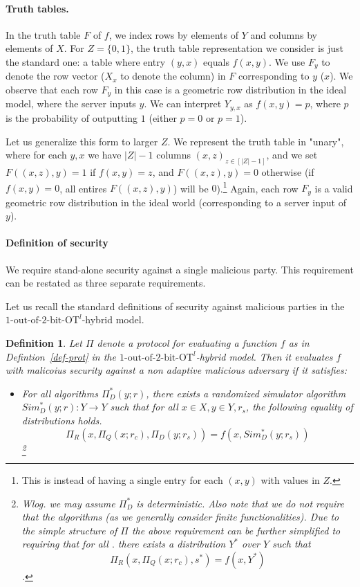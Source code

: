 \documentclass[a4paper]{article}
\newtheorem{definition}{Definition}[section]
\newcommand{\OT}[2]{#1\text{-out-of-}#2\text{-bit-OT}}
\begin{document}
\paragraph{Truth tables.} In the truth table $F$ of $f$, we index rows by elements of $Y$ and columns by elements of $X$. For $Z=\{0,1\}$, the truth table representation we consider is just the standard one: a table where entry $(y,x)$ equals $f(x,y)$. We use $F_y$ to denote the row vector ($X_x$ to denote the column) in $F$ corresponding to $y$ ($x$).
We observe that each row $F_y$ in this case is a geometric row distribution in the ideal model, where the server inputs $y$. We can interpret $Y_{y,x}$ as $f(x,y) = p$, where $p$ is the probability of outputting $1$ (either $p=0$ or $p=1$). 


Let us generalize this form to larger $Z$. We represent the truth table in "unary", where for each $y,x$ we have $|Z|-1$ columns $(x,z)_{z\in [|Z|-1]}$, and we set $F((x,z),y)=1$
if $f(x,y)=z$, and $F((x,z),y)=0$ otherwise (if $f(x,y)=0$, all entires $F((x,z),y)$) will be $0$).\footnote{This is instead of having a single entry for each $(x,y)$ with values in $Z$.}
Again, each row $F_y$ is a valid geometric row distribution in the ideal world (corresponding to a server input of $y$).


\paragraph{Definition of security}
We require stand-alone security against a single malicious party. This requirement can be restated as three separate requirements.

Let us recall the standard definitions of security against malicious parties in the ${\OT{1}{2}}^l$-hybrid model.
\begin{definition}
Let $\Pi$ denote a protocol for evaluating a function $f$ as in Defintion~\ref{def-prot} in the ${\OT{1}{2}}^l$-hybrid model. Then it evaluates $f$ with malicoius security against a non adaptive malicious adversary if it satisfies:
\begin{itemize}
	\item[Security against malicious servers:]
	For all algorithms $\Pi^*_D(y;r)$, there exists a randomized simulator algorithm $Sim^*_D(y;r):Y\rightarrow Y$ such that for all $x\in X,y\in Y,r_s$, the following equality of distributions holds.
	\[\Pi_R(x,\Pi_Q(x;r_c),\Pi_D(y;r_s))=f(x,Sim^*_D(y;r_s))\]
	\footnote{Wlog. we may assume $\Pi^*_D$ is deterministic. Also note that we do not require that the algorithms (as we generally consider finite functionalities). Due to the simple structure of $\Pi$ the above requirement can be further simplified to requiring that for all $.$ there exists a distribution $Y^*$ over $Y$ such that 
	\[\Pi_R(x,\Pi_Q(x;r_c),s^*)=f(x,Y^*)\].}
\end{itemize}
\end{definition}
\end{document}
